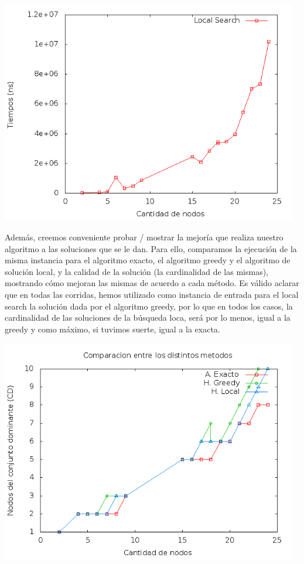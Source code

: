 \begin{center}
\includegraphics[width=13cm]{./graficos/tiempoLocalSearch.png}
\end{center}

Además, creemos conveniente probar / mostrar la mejoría que realiza nuestro algoritmo a las soluciones que se le dan. Para ello, comparamos la ejecución de la misma instancia para el algoritmo exacto, el algoritmo greedy y el algoritmo de solución local, y la calidad de la solución (la cardinalidad de las mismas), mostrando cómo mejoran las mismas de acuerdo a cada método. Es válido aclarar que en todas las corridas, hemos utilizado como instancia de entrada para el local search la solución  dada por el algoritmo greedy, por lo que en todos los casos, la cardinalidad de las soluciones de la búsqueda loca, será por lo menos, igual a la greedy y como máximo, si tuvimos suerte, igual a la exacta.

\begin{center}
\includegraphics[width=13cm]{./graficos/local_comparacion_soluciones.png}
\end{center}
